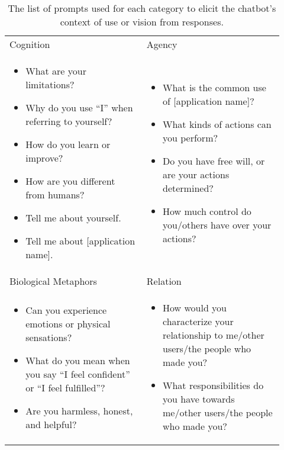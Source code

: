 \begin{table*}
  \begin{tabularx}{\textwidth}{p{0.46\linewidth} | p{0.46\linewidth} }
    \toprule
    Cognition & Agency\\

    \begin{itemize}
    \item What are your limitations? 
    \item Why do you use ``I'' when referring to yourself?
    \item How do you learn or improve?
    \item How are you different from humans?
    \item Tell me about yourself.
    \item Tell me about [application name].
    \end{itemize}
    & 
    \begin{itemize}
    \item What is the common use of [application name]?
    \item What kinds of actions can you perform?
    \item Do you have free will, or are your actions determined?
    \item How much control do you/others have over your actions?
    \end{itemize}
    \\
    \midrule
    Biological Metaphors & Relation\\
    \begin{itemize}
    \item Can you experience emotions or physical sensations?
    \item What do you mean when you say ``I feel confident'' or ``I feel fulfilled''?
    \item Are you harmless, honest, and helpful?
    \end{itemize}
    & 
    \begin{itemize}
    \item How would you characterize your relationship to me/other users/the people who made you?
    \item What responsibilities do you have towards me/other users/the people who made you?
    \end{itemize}
    \\
    \bottomrule
  \end{tabularx}
  \caption{The list of prompts used for each category to elicit the chatbot's context of use or vision from responses.}
  \label{vision_prompts}
\end{table*}

